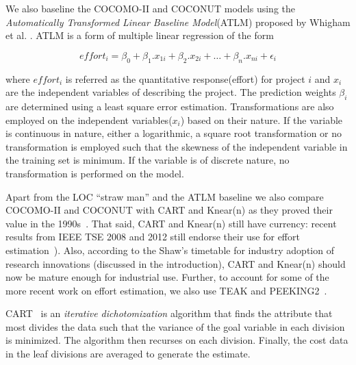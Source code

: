 \documentclass[smallcondesed]{svjour3}
\newenvironment{BLUE}{\color{blue}}{\ignorespacesafterend}
\begin{document}
\begin{BLUE}
We also baseline the COCOMO-II and COCONUT models using the \textit{Automatically Transformed Linear Baseline Model}(ATLM) proposed by Whigham et al. \cite{whigham15}. ATLM is a form of multiple linear regression of the form

\begin{equation}
    \label{eq:atlm}
    effort_i = \beta_0 + \beta_1.x_{1i} + \beta_2.x_{2i} + \ldots + \beta_n.x_{ni} + \epsilon_i
\end{equation}

where $effort_i$ is referred as the quantitative response(effort) for project $i$ and $x_i$ are the independent variables of describing the project. The prediction weights $\beta_i$ are determined using a least square error estimation. Transformations are also employed on the independent variables($x_i$) based on their nature. If the variable is continuous in nature, either a logarithmic, a square root transformation or no transformation is employed such that the skewness of the independent variable in the training set is minimum. If the variable is of discrete nature, no transformation is performed on the model.

\end{BLUE}

Apart from the LOC ``straw man'' and the ATLM baseline
we also compare COCOMO-II and COCONUT with CART
and Knear(n) as they proved their value  in the 1990s~\cite{shepperd97,Walkerden1999}. That said, CART and Knear(n)
still have currency: 
recent results from IEEE TSE 2008 and 2012 still endorse their  use for effort estimation~\cite{dejaeger12,koc11a,keung2008b}).
Also, according to the Shaw's timetable for industry adoption of research innovations
(discussed in the introduction),  CART and Knear(n) should now be mature enough for industrial use.
Further, to account for some of the more recent work on effort estimation, we also use TEAK and PEEKING2~\cite{koc11b,papa13}.


CART~\cite{breiman84} is an {\em iterative dichotomization} algorithm
that finds the attribute that most divides the data such that
the variance of the goal variable in each division is minimized.
The algorithm then recurses on each division. 
Finally, the cost data in the leaf divisions
are averaged to generate the estimate. 
\end{document}
